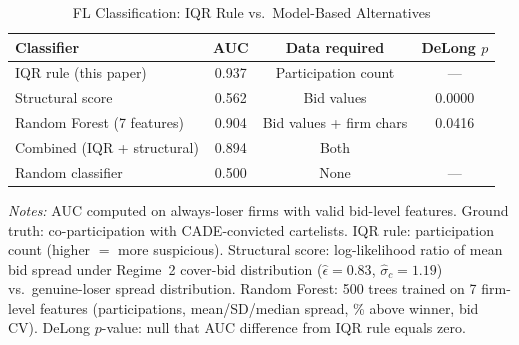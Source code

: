 \begin{table}[htbp]
\centering
\caption{FL Classification: IQR Rule vs.\ Model-Based Alternatives}
\label{tab:classification_comparison}
\begin{threeparttable}
\small
\begin{tabular}{lccc}
\toprule
Classifier & AUC & Data required & DeLong $p$ \\
\midrule
IQR rule (this paper) & 0.937 & Participation count & --- \\
Structural score & 0.562 & Bid values & 0.0000 \\
Random Forest (7 features) & 0.904 & Bid values + firm chars & 0.0416 \\
Combined (IQR + structural) & 0.894 & Both & \\
Random classifier & 0.500 & None & --- \\
\bottomrule
\end{tabular}
\begin{tablenotes}
\small
\item \textit{Notes:} AUC computed on always-loser firms with valid
bid-level features. Ground truth: co-participation with CADE-convicted
cartelists. IQR rule: participation count (higher $=$ more suspicious).
Structural score: log-likelihood ratio of mean bid spread under Regime~2
cover-bid distribution ($\hat{\epsilon} = 0.83$, $\hat{\sigma}_c = 1.19$)
vs.\ genuine-loser spread distribution.
Random Forest: 500 trees trained on 7 firm-level features (participations,
mean/SD/median spread, \% above winner, bid CV).
DeLong $p$-value: null that AUC difference from IQR rule equals zero.
\end{tablenotes}
\end{threeparttable}
\end{table}
